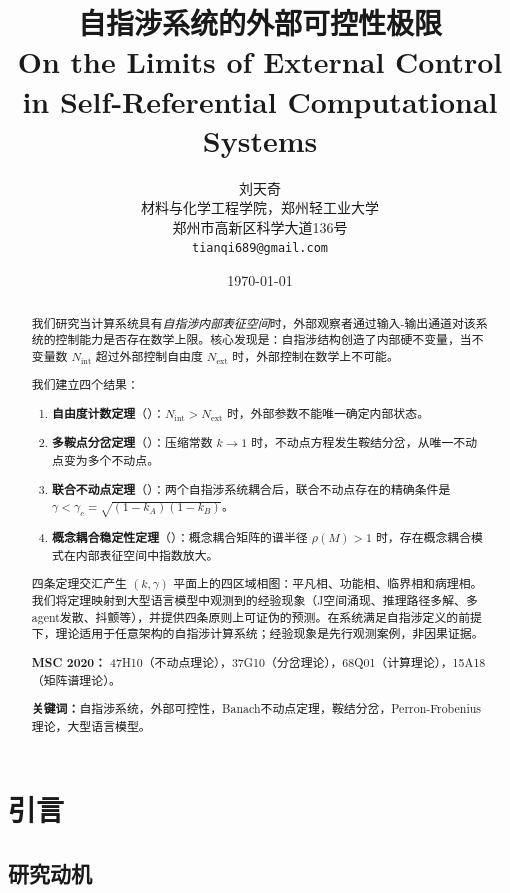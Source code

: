 \documentclass[12pt,a4paper]{article}
\title{自指涉系统的外部可控性极限\\
\large On the Limits of External Control in Self-Referential Computational Systems}
\author{刘天奇\\
材料与化学工程学院，郑州轻工业大学\\
郑州市高新区科学大道136号\\
\texttt{tianqi689@gmail.com}
}
\date{\today}
\theoremstyle{definition}
\newcommand{\Nint}{N_{\mathrm{int}}}
\newcommand{\Next}{N_{\mathrm{ext}}}
\newcommand{\gamc}{\gamma_c}
\begin{document}
\maketitle

\begin{abstract}
我们研究当计算系统具有\emph{自指涉内部表征空间}时，外部观察者通过输入-输出通道对该系统的控制能力是否存在数学上限。核心发现是：自指涉结构创造了内部硬不变量，当不变量数 $\Nint$ 超过外部控制自由度 $\Next$ 时，外部控制在数学上不可能。

我们建立四个结果：
\begin{enumerate}[leftmargin=*]
\item \textbf{自由度计数定理}（）：$\Nint > \Next$ 时，外部参数不能唯一确定内部状态。
\item \textbf{多鞍点分岔定理}（）：压缩常数 $k \to 1$ 时，不动点方程发生鞍结分岔，从唯一不动点变为多个不动点。
\item \textbf{联合不动点定理}（）：两个自指涉系统耦合后，联合不动点存在的精确条件是 $\gamma < \gamc = \sqrt{(1-k_A)(1-k_B)}$。
\item \textbf{概念耦合稳定性定理}（）：概念耦合矩阵的谱半径 $\rho(M) > 1$ 时，存在概念耦合模式在内部表征空间中指数放大。
\end{enumerate}

四条定理交汇产生 $(k, \gamma)$ 平面上的四区域相图：平凡相、功能相、临界相和病理相。我们将定理映射到大型语言模型中观测到的经验现象（J空间涌现、推理路径多解、多agent发散、抖颤等），并提供四条原则上可证伪的预测。在系统满足自指涉定义的前提下，理论适用于任意架构的自指涉计算系统；经验现象是先行观测案例，非因果证据。

\medskip
\noindent\textbf{MSC 2020：} 47H10（不动点理论），37G10（分岔理论），68Q01（计算理论），15A18（矩阵谱理论）。

\medskip
\noindent\textbf{关键词：}自指涉系统，外部可控性，Banach不动点定理，鞍结分岔，Perron-Frobenius理论，大型语言模型。
\end{abstract}

\tableofcontents
\newpage

\section{引言}
\label{sec:intro}

\subsection{研究动机}
\end{document}
